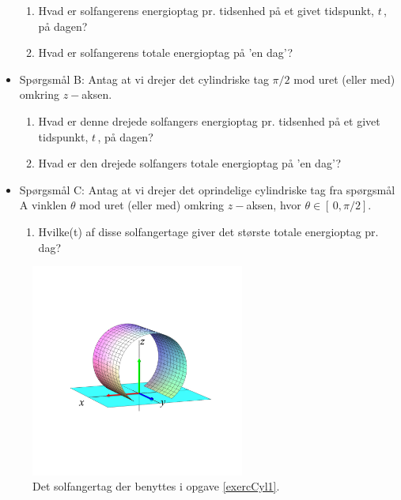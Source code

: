 \begin{exercise}
\begin{itemize}
\begin{enumerate}
\item Hvad er solfangerens energioptag pr. tidsenhed på et givet tidspunkt, $t\,$, på dagen?

\item Hvad er solfangerens totale energioptag på 'en dag'?
\end{enumerate}


\item Spørgsmål B: Antag at vi drejer det cylindriske tag $\pi/2$ mod uret (eller med) omkring $z-$aksen.
\begin{enumerate}
\item Hvad er denne drejede solfangers energioptag pr. tidsenhed på et givet tidspunkt, $t\,$, på dagen?
\item Hvad er den drejede solfangers totale energioptag på 'en dag'?
\end{enumerate}



\item Spørgsmål C:
Antag at vi drejer det oprindelige cylindriske tag fra spørgsmål A vinklen $\theta$ mod uret (eller med) omkring $z-$aksen, hvor $\theta \in [\,0, \pi/2]$.

\begin{enumerate}

\item Hvilke(t) af disse solfangertage giver det største totale energioptag pr. dag?
\end{enumerate}


\end{itemize}

\end{exercise}



\begin{figure}[h]
\centerline{\includegraphics[width=70mm]{FIGS/plotSolCylinder}}
\begin{center}
\caption{\small{Det solfangertag der benyttes  i opgave \ref{exercCyl1}.}}
\label{figCylLift}
\end{center}
\end{figure}

